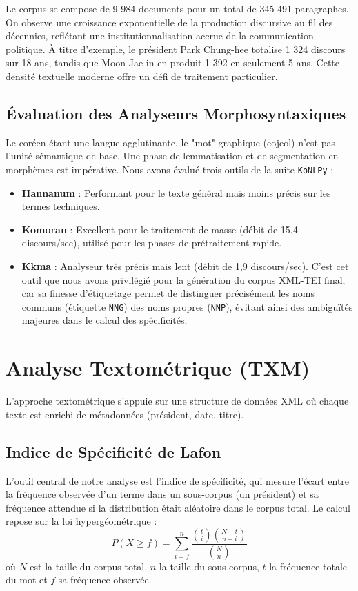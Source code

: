 \documentclass[11pt]{article}
\begin{document}
Le corpus se compose de 9 984 documents pour un total de 345 491 paragraphes. On observe une croissance exponentielle de la production discursive au fil des décennies, reflétant une institutionnalisation accrue de la communication politique. À titre d'exemple, le président Park Chung-hee totalise 1 324 discours sur 18 ans, tandis que Moon Jae-in en produit 1 392 en seulement 5 ans. Cette densité textuelle moderne offre un défi de traitement particulier.

\subsection{Évaluation des Analyseurs Morphosyntaxiques}
Le coréen étant une langue agglutinante, le "mot" graphique (eojeol) n'est pas l'unité sémantique de base. Une phase de lemmatisation et de segmentation en morphèmes est impérative. Nous avons évalué trois outils de la suite \texttt{KoNLPy} :
\begin{itemize}
    \item \textbf{Hannanum} : Performant pour le texte général mais moins précis sur les termes techniques.
    \item \textbf{Komoran} : Excellent pour le traitement de masse (débit de 15,4 discours/sec), utilisé pour les phases de prétraitement rapide.
    \item \textbf{Kkma} : Analyseur très précis mais lent (débit de 1,9 discours/sec). C'est cet outil que nous avons privilégié pour la génération du corpus XML-TEI final, car sa finesse d'étiquetage permet de distinguer précisément les noms communs (étiquette \texttt{NNG}) des noms propres (\texttt{NNP}), évitant ainsi des ambiguïtés majeures dans le calcul des spécificités.
\end{itemize}

\section{Analyse Textométrique (TXM)}
L'approche textométrique s'appuie sur une structure de données XML où chaque texte est enrichi de métadonnées (président, date, titre).

\subsection{Indice de Spécificité de Lafon}
L'outil central de notre analyse est l'indice de spécificité, qui mesure l'écart entre la fréquence observée d'un terme dans un sous-corpus (un président) et sa fréquence attendue si la distribution était aléatoire dans le corpus total.
Le calcul repose sur la loi hypergéométrique :
\[ P(X \ge f) = \sum_{i=f}^{n} \frac{\binom{t}{i} \binom{N-t}{n-i}}{\binom{N}{n}} \]
où $N$ est la taille du corpus total, $n$ la taille du sous-corpus, $t$ la fréquence totale du mot et $f$ sa fréquence observée.
\end{document}
